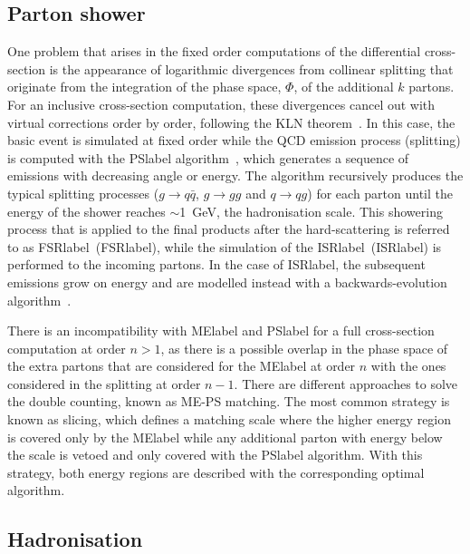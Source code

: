 \subsection{Parton shower}

One problem that arises in the fixed order computations of the differential cross-section is the appearance of logarithmic divergences from collinear splitting that originate from the integration of the phase space, $\Phi$, of the additional $k$ partons. For an inclusive cross-section computation, these divergences cancel out with virtual corrections order by order, following the KLN theorem~\cite{Masssingularities,PhysRev.133.B1549}.
In this case, the basic event is simulated at fixed order while the \acrshort{QCD} emission process (splitting) is computed with the \acrshort{PSlabel} algorithm~\cite{FOX1980285}, 
which generates a sequence of emissions with decreasing angle or energy. The algorithm recursively produces the typical splitting processes ($g\to q\bar{q}$, $g\to gg$ and $q\to qg$) for each parton until the energy of the shower reaches $\sim$1~GeV, the hadronisation scale. This showering process that is applied to the final products after the hard-scattering is referred to as \acrlong{FSRlabel}~(\acrshort{FSRlabel}), while the simulation of the \acrlong{ISRlabel}~(\acrshort{ISRlabel}) is performed to the incoming partons. In the case of \acrshort{ISRlabel}, the subsequent emissions grow on energy and are modelled instead with a backwards-evolution algorithm~\cite{SJOSTRAND1985321}. 

There is an incompatibility with \acrshort{MElabel} and \acrshort{PSlabel} for a full cross-section computation at order $n>1$, as there is a possible overlap in the phase space of the extra partons that are considered for the \acrshort{MElabel} at order $n$ with the ones considered in the splitting at order $n-1$. There are different approaches to solve the double counting, known as ME-PS matching. The most common strategy is known as slicing, which defines a matching scale where the higher energy region is covered only by the \acrshort{MElabel} while any additional parton with energy below the scale is vetoed and only covered with the \acrshort{PSlabel} algorithm. With this strategy, both energy regions are described with the corresponding optimal algorithm.

\subsection{Hadronisation}

